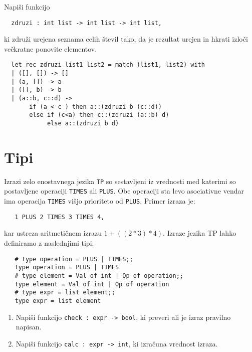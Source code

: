 \begin{ex}
  Napi\v si funkcijo

  \begin{verbatim}
  zdruzi : int list -> int list -> int list,
  \end{verbatim}

  ki zdru\v zi urejena seznama celih \v stevil tako, da je rezultat
  urejen in hkrati izlo\v ci ve\v ckratne ponovite elementov.


  \begin{sol}
  \begin{verbatim}
  let rec zdruzi list1 list2 = match (list1, list2) with
  | ([], []) -> []
  | (a, []) -> a
  | ([], b) -> b
  | (a::b, c::d) -> 
       if (a < c ) then a::(zdruzi b (c::d))
       else if (c<a) then c::(zdruzi (a::b) d)
            else a::(zdruzi b d)
  \end{verbatim}
  \end{sol}

\end{ex} 

\section{Tipi}

\begin{ex}
   Izrazi zelo enostavnega jezika \texttt{TP} so sestavljeni iz
   vrednosti med katerimi so postavljene operaciji \texttt{TIMES} ali
   \texttt{PLUS}. Obe operaciji sta levo asociativne vendar ima
   operacija \texttt{TIMES} vi\v sjo prioriteto od
   \texttt{PLUS}. Primer izraza je:

   \begin{verbatim}
   1 PLUS 2 TIMES 3 TIMES 4,
   \end{verbatim}

   kar ustreza aritmeti\v cnem izrazu $1 + ((2 * 3) * 4)$. Izraze jezika
   TP lahko definiramo z naslednjimi tipi:
 
   \begin{verbatim}
   # type operation = PLUS | TIMES;; 
   type operation = PLUS | TIMES 
   # type element = Val of int | Op of operation;; 
   type element = Val of int | Op of operation
   # type expr = list element;;
   type expr = list element
   \end{verbatim}

   \begin{enumerate}[label=(\roman*)]
   \item Napi\v si funkcijo \texttt{check : expr -> bool}, ki preveri
     ali je izraz pravilno napisan.

   \item Napi\v si funkcijo \texttt{calc : expr -> int}, ki izra\v
     cuna vrednost izraza.
   \end{enumerate}


\end{ex}


